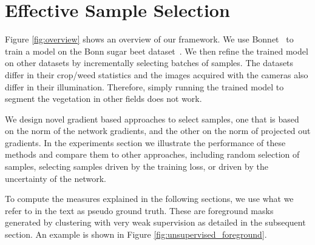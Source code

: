 \documentclass[letterpaper, 10 pt, conference]{ieeeconf}  %
\begin{document}
\section{Effective Sample Selection}\label{sec:approach}

Figure \ref{fig:overview} shows an overview of our framework. We use Bonnet~\cite{milioto2018bonnet} to train a model on the Bonn sugar beet dataset~\cite{chebrolu2017agricultural}. We then refine the trained model on other datasets by incrementally selecting batches of samples. The datasets differ in their crop/weed statistics and the images acquired with the cameras also differ in their illumination. Therefore, simply running the trained model to segment the vegetation in other fields does not work.

We design novel gradient based approaches to select samples, one that is based on the norm of the network gradients, and the other on the norm of projected out gradients. In the experiments section we illustrate the performance of these methods and compare them to other approaches, including random selection of samples, selecting samples driven by the training loss, or driven by the uncertainty of the network.
   

To compute the measures explained in the following sections, we use what we refer to in the text as pseudo ground truth. These are foreground masks generated by clustering with very weak supervision as detailed in the subsequent section. An example is shown in Figure \ref{fig:unsupervised_foreground}.
\end{document}
